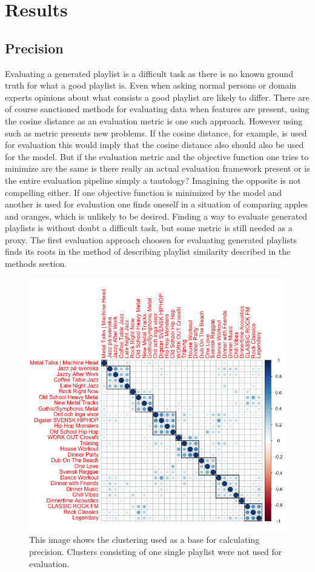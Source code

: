 \documentclass[a4paper,11pt]{kth-mag}
\begin{document}
\chapter{Results}
\section{Precision}
Evaluating a generated playlist is a difficult task as there is no known ground truth for what a good playlist is. Even when asking normal persons or domain experts opinions about what consists a good playlist are likely to differ. There are of course sanctioned methods for evaluating data when features are present, using the cosine distance as an evaluation metric is one such approach. However using such as metric presents new problems. If the cosine distance, for example, is used for evaluation this would imply that the cosine distance also should also be used for the model. But if the evaluation metric and the objective function one tries to minimize are the same is there really an actual evaluation framework present or is the entire evaluation pipeline simply a tautology? Imagining the opposite is not compelling either. If one objective function is minimized by the model and another is used for evaluation one finds oneself in a situation of comparing apples and oranges, which is unlikely to be desired. Finding a way to evaluate generated playlists is without doubt a difficult task, but some metric is still needed as a proxy.
The first evaluation approach choosen for evaluating generated playlists finds its roots in the method of describing playlist similarity described in the methods section. 

\begin{figure}
\includegraphics[scale=0.5]{images/sumAbsAgglHierClust-better.png}
\caption{This image shows the clustering used as a base for calculating precision. Clusters consisting of one single playlist were not used for evaluation.}
\end{figure}
\end{document}
